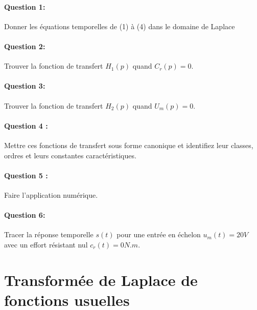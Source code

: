 \paragraph{Question 1:} Donner les équations temporelles de (1) à (4) dans le domaine de Laplace

\paragraph{Question 2:} Trouver la fonction de transfert $H_1(p)$ quand $C_r(p)=0$.

\paragraph{Question 3:} Trouver la fonction de transfert $H_2(p)$ quand $U_m(p)=0$.

\paragraph{Question 4 :} Mettre ces fonctions de transfert sous forme canonique et identifiez leur classes, ordres et leurs constantes caractéristiques.

\paragraph{Question 5 :} Faire l'application numérique.

\paragraph{Question 6:} Tracer la réponse temporelle $s(t)$ pour une entrée en échelon $u_m(t)=20V$ avec un effort résistant nul $c_r(t)=0N.m$.

\newpage

\section{Transformée de Laplace de fonctions usuelles}

